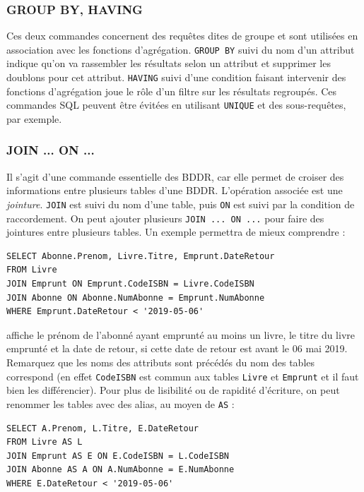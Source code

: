 \documentclass[11pt,a4paper,french,twoside]{PMCours}
\begin{document}
\subsubsection*{GROUP BY, HAVING}

Ces deux commandes concernent des requêtes dites de groupe et sont utilisées en association avec les fonctions d'agrégation. \verb'GROUP BY' suivi du nom d'un attribut indique qu'on va rassembler les résultats selon un attribut et supprimer les doublons pour cet attribut. \verb'HAVING' suivi d'une condition faisant intervenir des fonctions d'agrégation joue le rôle d'un filtre sur les résultats regroupés. Ces commandes SQL peuvent être évitées en utilisant \verb'UNIQUE' et des sous-requêtes, par exemple.


\subsubsection*{JOIN ... ON ...}

Il s'agit d'une commande essentielle des BDDR, car elle permet de croiser des informations entre plusieurs tables d'une BDDR. L'opération associée est une \emph{jointure}. \verb'JOIN' est suivi du nom d'une table, puis \verb'ON' est suivi par la condition de raccordement. On peut ajouter plusieurs \verb'JOIN ... ON ...' pour faire des jointures entre plusieurs tables. Un exemple permettra de mieux comprendre : 
\begin{verbatim}
SELECT Abonne.Prenom, Livre.Titre, Emprunt.DateRetour 
FROM Livre 
JOIN Emprunt ON Emprunt.CodeISBN = Livre.CodeISBN
JOIN Abonne ON Abonne.NumAbonne = Emprunt.NumAbonne
WHERE Emprunt.DateRetour < '2019-05-06'
\end{verbatim}
affiche le prénom de l'abonné ayant emprunté au moins un livre, le titre du livre emprunté et la date de retour, si cette date de retour est avant le 06 mai 2019. Remarquez que les noms des attributs sont précédés du nom des tables correspond (en effet \verb'CodeISBN' est commun aux tables \verb'Livre' et \verb'Emprunt' et il faut bien les différencier). Pour plus de lisibilité ou de rapidité d'écriture, on peut renommer les tables avec des alias, au moyen de \verb'AS' : 
\begin{verbatim}
SELECT A.Prenom, L.Titre, E.DateRetour 
FROM Livre AS L
JOIN Emprunt AS E ON E.CodeISBN = L.CodeISBN
JOIN Abonne AS A ON A.NumAbonne = E.NumAbonne
WHERE E.DateRetour < '2019-05-06'
\end{verbatim}
\end{document}
